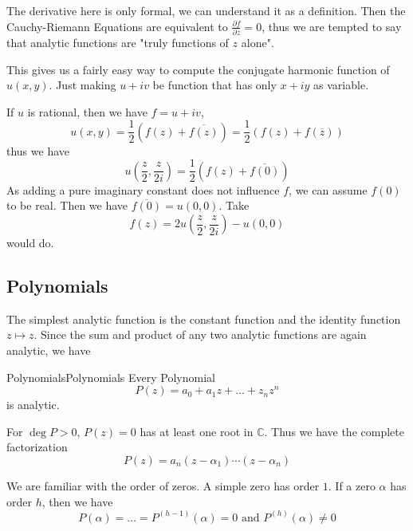 \documentclass[../main.tex]{subfiles}
\begin{document}
The derivative here is only formal, we can understand it as a definition. Then the Cauchy-Riemann Equations are equivalent to $\displaystyle \frac{\partial f}{\partial \overline{z}} = 0$, thus we are tempted to say that analytic functions are "truly functions of $z$ alone".

This gives us a fairly easy way to compute the conjugate harmonic function of $u(x,y)$. Just making $u+iv$ be function that has only $x+iy$ as variable.

If $u$ is rational, then we have $f=u+iv$,
\begin{equation*}
	u(x,y) = \frac{1}{2}(f(z) + \overline{f(z)}) = \frac{1}{2}(f(z)+f(\overline{z}))
\end{equation*}
thus we have
\begin{equation*}
u(\frac{z}{2},\frac{z}{2i}) = \frac{1}{2} \left(f(z)+\overline{f(0)}\right)
\end{equation*}
As adding a pure imaginary constant does not influence $f$, we can assume $f(0)$ to be real. Then we have $\overline{f(0)} = u(0,0)$. Take
\begin{equation}
	f(z) = 2u(\frac{z}{2},\frac{z}{2i}) - u(0,0)
\end{equation}
would do.

\subsection{Polynomials}

The simplest analytic function is the constant function and the identity function $z \mapsto z$. Since the sum and product of any two analytic functions are again analytic, we have
\begin{theorem}{Polynomials}{Polynomials}
Every Polynomial
\begin{equation}
P(z) = a_0+a_1z+\ldots +z_nz^n
\end{equation}
is analytic.
\end{theorem}

For $\deg P>0$, $P(z)=0$ has at least one root in $\mathbb{C}$. Thus we have the complete factorization
\begin{equation*}
P(z) = a_n(z-\alpha_1) \cdots (z-\alpha_n)
\end{equation*}

We are familiar with the order of zeros. A simple zero has order $1$. If a zero $\alpha$ has order $h$, then we have
\begin{equation*}
P(\alpha)=\ldots =P^{(h-1)}(\alpha) = 0 \text{ and } P^{(h)}(\alpha)\neq 0
\end{equation*}
\end{document}
